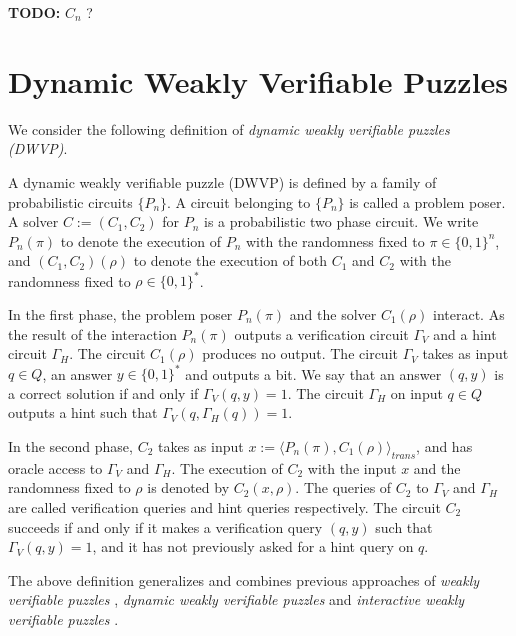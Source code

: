 \documentclass[11pt,a4paper,titlepage]{memoir}
\begin{document}
\begin{todo}
  \textbf{TODO:} $C_n$ ?
\end{todo}

\section{Dynamic Weakly Verifiable Puzzles}
\label{section:wvp}
We consider the following definition of \textit{dynamic weakly verifiable puzzles (DWVP)}.
\begin{definition}
  \label{def:dwvp}
  A \textnormal{dynamic weakly verifiable puzzle (DWVP)} is defined by a family of probabilistic circuits $\{P_n\}$.
  A circuit belonging to $\{P_n\}$ is called a problem poser.
  A solver $C := (C_1, C_2)$ for $P_n$ is a probabilistic two phase circuit.
  We write $P_n(\pi)$ to denote the execution of $P_n$ with the randomness fixed to $\pi \in \{0,1\}^n$, and $(C_1,C_2)(\rho)$
  to denote the execution of both $C_1$ and $C_2$ with the randomness fixed to $\rho \in \{0,1\}^{*}$.

  In the first phase, the problem poser $P_n(\pi)$ and the solver $C_1(\rho)$ interact.
  As the result of the interaction $P_n(\pi)$ outputs a verification circuit $\Gamma_{V}$ and a hint circuit $\Gamma_{H}$.
  The circuit $C_1(\rho)$ produces no output.
  The circuit $\Gamma_{V}$ takes as input $q \in Q$, an answer $y \in \{0,1\}^*$
  and outputs a bit. We say that an answer $(q,y)$ is a correct solution if and only if $\Gamma_V(q,y) = 1$.
  The circuit $\Gamma_H$ on input $q \in Q$ outputs a hint such that $\Gamma_V(q,\Gamma_H(q)) = 1$.

  In the second phase, $C_2$ takes as input $x := \langle P_n(\pi), C_1(\rho) \rangle_{\mathit{trans}}$,
  and has oracle access to $\Gamma_V$ and $\Gamma_H$.
  The execution of $C_2$ with the input $x$ and the randomness fixed to $\rho$
  is denoted by $C_2(x, \rho)$. The queries of $C_2$ to $\Gamma_V$ and $\Gamma_H$ are called verification queries and hint queries respectively.
  The circuit $C_2$ succeeds if and only if it makes a verification query $(q,y)$ such that $\Gamma_V(q,y) = 1$,
  and it has not previously asked for a hint query on $q$.
\end{definition}

The above definition generalizes and combines previous approaches of
\textit{weakly verifiable puzzles} \cite{canetti2004hardness},
\textit{dynamic weakly verifiable puzzles} \cite{Dodis:2009:SAI:1530441.1530450}
and \textit{interactive weakly verifiable puzzles} \cite{DBLP:journals/corr/abs-1002-3534}.
\end{document}
